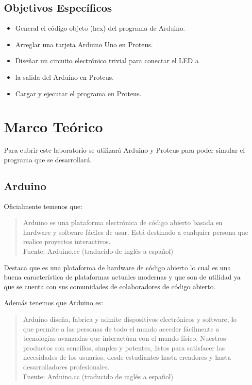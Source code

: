 \documentclass{article}
\begin{document}
    \subsection{Objetivos Específicos}

    \begin{itemize}
        \item General el código objeto (hex) del programa de Arduino.
        \item Arreglar una tarjeta Arduino Uno en Proteus.
        \item Diseñar un circuito electrónico trivial para conectar el LED a
        \item la salida del Arduino en Proteus.
        \item Cargar y ejecutar el programa en Proteus.
    \end{itemize}

    \section{Marco Teórico}

    Para cubrir este laboratorio se utilizará Arduino y Proteus para poder
    simular el programa que se desarrollará.

    \subsection{Arduino}

    Oficialmente temenos que:

    \begin{quote}
        Arduino es una plataforma electrónica de código abierto basada en
        hardware y software fáciles de usar. Está destinado a cualquier
        persona que realice proyectos interactivos.\\ \footnotesize
        Fuente: Arduino.cc (traducido de inglés a español) \cite{arduino-2022}
    \end{quote}

    Destaca que es una plataforma de hardware de código abierto lo cual es
    una buena característica de plataformas actuales modernas y que son de
    utilidad ya que se cuenta con sus comunidades de colaboradores de código
    abierto.

    Además tenemos que Arduino es:

    \begin{quote}
        Arduino diseña, fabrica y admite dispositivos electrónicos y
        software, lo que permite a las personas de todo el mundo acceder
        fácilmente a tecnologías avanzadas que interactúan con el mundo
        físico. Nuestros productos son sencillos, simples y potentes, listos
        para satisfacer las necesidades de los usuarios, desde estudiantes
        hasta creadores y hasta desarrolladores profesionales. \\ \footnotesize
        Fuente: Arduino.cc (traducido de inglés a español) \cite{arduino-2022}
    \end{quote}
\end{document}
